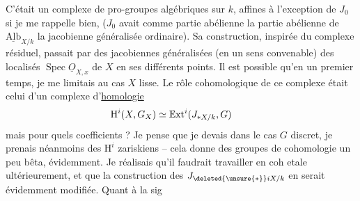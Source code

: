 C'était un complexe de pro-groupes algébriques sur $k$, affines à l'exception de $J_0$ si je me rappelle bien, ($J_0$ avait comme partie abélienne la partie abélienne de $\underline{\mathrm{Alb}}_{X/k}$
la jacobienne généralisée ordinaire). Sa construction, inspirée du complexe résiduel, passait par des jacobiennes généralisées (en un sens  convenable) des localisés $\operatorname{Spec}\underline{O}_{X,x}$ de $X$ en ses différents points. Il est possible qu'en un premier temps, je me limitais au cas $X$ lisse. Le rôle cohomologique de ce complexe était celui d'un complexe d'\uline{homologie}
\[
\mathrm{H}^{i}(X,G_X)\simeq\mathbb{E}\mathrm{xt}^{i}(J_{*X/k},G)\tag*{\makebox[0pt][r]{\makebox[\linewidth][l]{\unsure{\ensuremath{\alpha})|a)|(*)}}}}
\]
mais pour quels coefficients ? Je pense que je devais     dans le cas $G$ discret, je prenais néanmoins des $\mathrm{H}^{i}$ zariskiens -- cela donne des groupes de cohomologie un peu bêta, évidemment. Je réalisais qu'il faudrait travailler en coh etale ultérieurement, et que la construction des $J_{\deleted{\unsure{*}}iX/k}$ en serait évidemment modifiée. Quant à la sig%
